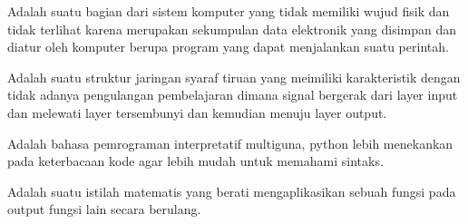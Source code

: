 Adalah suatu bagian dari sistem komputer yang tidak memiliki wujud fisik dan tidak terlihat karena merupakan sekumpulan data elektronik yang disimpan dan diatur oleh komputer berupa program yang dapat menjalankan suatu perintah.

Adalah suatu struktur jaringan syaraf tiruan yang meimiliki karakteristik dengan tidak adanya pengulangan pembelajaran dimana signal bergerak dari layer input dan melewati layer tersembunyi dan kemudian menuju layer output.

Adalah bahasa pemrograman interpretatif multiguna, python lebih menekankan pada keterbacaan kode agar lebih mudah untuk memahami sintaks.

Adalah suatu istilah matematis yang berati mengaplikasikan sebuah fungsi pada output fungsi lain secara berulang.

